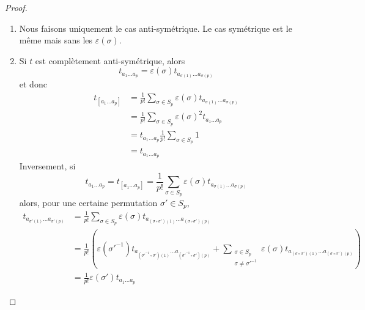 \documentclass[a4paper,11pt]{report}
\theoremstyle{definition}
\theoremstyle{plain}
\theoremstyle{definition}
\theoremstyle{remark}
\begin{document}
                \begin{proof}${}$
                    \begin{enumerate}[label = \textit{\roman*)}]
                        \item Nous faisons uniquement le cas anti-symétrique. Le cas symétrique est le même mais sans les $\varepsilon(\sigma)$.
                        \item Si $t$ est complètement anti-symétrique, alors 
                        \begin{equation}
                            t_{a_1\dots a_p} = \varepsilon(\sigma)t_{a_{\sigma(1)}\dots a_{\sigma(p)}}
                        \end{equation}
                        et donc
                        \begin{align}
                            t_{[a_1\dots a_p]} &= \frac{1}{p!}\sum_{\sigma\in S_p}\varepsilon(\sigma) t_{a_{\sigma(1)}\dots a_{\sigma(p)}}\\
                            &= \frac{1}{p!}\sum_{\sigma\in S_p}\varepsilon(\sigma)^2 t_{a_1\dots a_p}\\
                            &= t_{a_1\dots a_p} \frac{1}{p!}\sum_{\sigma\in S_p}1\\
                            &= t_{a_1\dots a_p}
                        \end{align}
                        Inversement, si
                        \begin{equation}
                            t_{a_1\dots a_p} = t_{[a_1\dots a_p]}
                            = \frac{1}{p!}\sum_{\sigma\in S_p}\varepsilon(\sigma) t_{a_{\sigma(1)}\dots a_{\sigma(p)}}
                        \end{equation}
                        alors, pour une certaine permutation $\sigma'\in S_p$,
                        \begin{align}
                            t_{a_{\sigma'(1)}\dots a_{\sigma'(p)}} &=  \frac{1}{p!}\sum_{\sigma\in S_p}\varepsilon(\sigma) t_{a_{(\sigma\circ\sigma')(1)}\dots a_{(\sigma\circ\sigma')(p)}}\\
                            &= \frac{1}{p!}\left( \varepsilon(\sigma'^{-1}) t_{a_{(\sigma'^{-1}\circ\sigma')(1)}\dots a_{(\sigma'^{-1}\circ\sigma')(p)}}+\sum_{\substack{\sigma\in S_p\\\sigma\neq\sigma'^{-1}}} \varepsilon(\sigma) t_{a_{(\sigma\circ\sigma')(1)}\dots a_{(\sigma\circ\sigma')(p)}} \right)\\
                            &= \frac{1}{p!}  \varepsilon(\sigma')t_{a_1\dots a_p}

\end{align}
\end{enumerate}
\end{proof}
\end{document}
